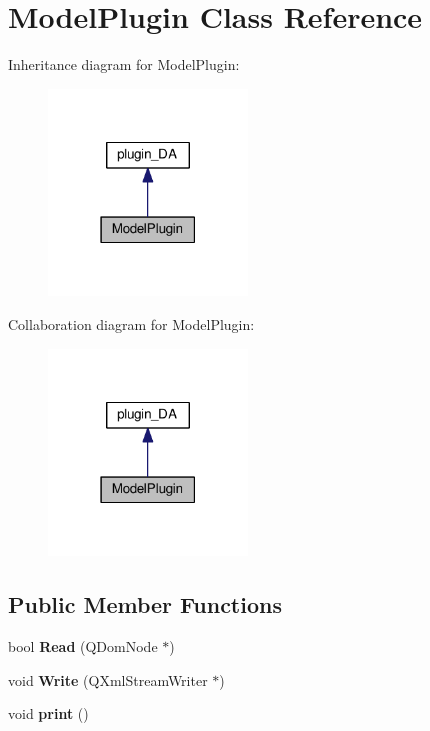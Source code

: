 \section{Model\+Plugin Class Reference}
\label{class_model_plugin}


Inheritance diagram for Model\+Plugin\+:\nopagebreak
\begin{figure}[H]
\begin{center}
\leavevmode
\includegraphics[width=150pt]{class_model_plugin__inherit__graph}
\end{center}
\end{figure}


Collaboration diagram for Model\+Plugin\+:\nopagebreak
\begin{figure}[H]
\begin{center}
\leavevmode
\includegraphics[width=150pt]{class_model_plugin__coll__graph}
\end{center}
\end{figure}
\subsection*{Public Member Functions}
\begin{DoxyCompactItemize}
\item 
bool {\bfseries Read} (Q\+Dom\+Node $\ast$)\label{class_model_plugin_a85f61be83cd279ad687cbfb63a7e9b8d}

\item 
void {\bfseries Write} (Q\+Xml\+Stream\+Writer $\ast$)\label{class_model_plugin_a510769e35fd13feb687ff6712cb5068e}

\item 
void {\bfseries print} ()\label{class_model_plugin_a77134aa807e0257039ab507db895b768}

\end{DoxyCompactItemize}
